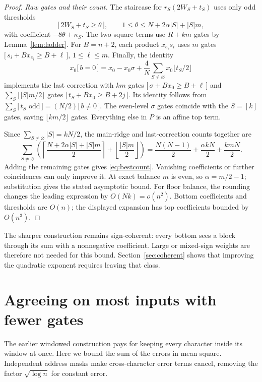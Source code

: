 \documentclass[11pt,letterpaper]{article}
\theoremstyle{remark}
\newcommand{\ind}[1]{\bigl[\,#1\,\bigr]}
\newcommand{\sect}[1]{\section{\texorpdfstring{\color{ink}#1}{#1}}}
\begin{document}
\begin{proof}
\emph{Raw gates and their count.}
The staircase for $r_S(2W_S+t_S)$ uses only odd thresholds
\[
\ind{2W_S+t_S\ge\theta},\qquad
1\le\theta\le N+2\alpha|S|+|S|m,
\]
with coefficient $-8\theta+\kappa_S$. The two square terms use $R+km$
gates by Lemma~\ref{lem:ladder}. For $B=n+2$, each product $x_{e_i}s_i$
uses $m$ gates $\ind{s_i+Bx_{e_i}\ge B+\ell}$, $1\le\ell\le m$.
Finally, the identity
\[
x_0\ind{b=0}=x_0-x_0\sigma+
 \frac4N\sum_{S\ne\varnothing}x_0\lfloor t_S/2\rfloor
\]
implements the last correction with $km$ gates
$\ind{\sigma+Bx_0\ge B+\ell}$ and
$\sum_S\lfloor |S|m/2\rfloor$ gates
$\ind{t_S+Bx_0\ge B+2j}$. Its identity follows from
$\sum_S\ind{t_S\text{ odd}}=(N/2)\ind{b\ne0}$.
The even-level $\sigma$ gates coincide with the $S=[k]$ gates, saving
$\lfloor km/2\rfloor$ gates. Everything else in $P$ is an affine top term.

Since $\sum_{S\ne\varnothing}|S|=kN/2$, the main-ridge and last-correction
counts together are
\[
\sum_{S\ne\varnothing}\left(
 \left\lceil\frac{N+2\alpha|S|+|S|m}{2}\right\rceil
 +\left\lfloor\frac{|S|m}{2}\right\rfloor\right)
 =\frac{N(N-1)}2+\frac{\alpha kN}2+\frac{kmN}2.
\]
Adding the remaining gates gives \eqref{eq:bestcount}. Vanishing coefficients
or further coincidences can only improve it. At exact balance $m$ is even,
so $\alpha=m/2-1$; substitution gives the stated asymptotic bound.
For floor balance, the rounding changes the leading expression by
$O(Nk)=o(n^2)$. Bottom coefficients and thresholds are $O(n)$; the displayed
expansion has top coefficients bounded by $O(n^3)$.
\end{proof}

The sharper construction remains sign-coherent: every bottom sees a block
through its sum with a nonnegative coefficient. Large or mixed-sign weights
are therefore not needed for this bound. Section~\ref{sec:coherent} shows
that improving the quadratic exponent requires leaving that class.


\sect{Agreeing on most inputs with fewer gates}\label{sec:avgupper}

The earlier windowed construction pays for keeping every character inside
its window at once. Here we bound the sum of the errors in mean square.
Independent address masks make cross-character error terms cancel, removing
the factor $\sqrt{\log n}$ for constant error.
\end{document}
